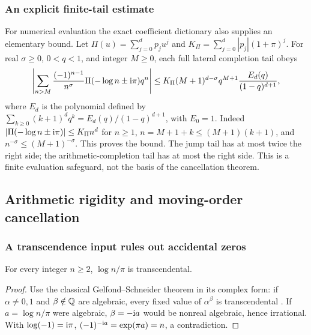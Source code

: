 \subsubsection{An explicit finite-tail estimate}
For numerical evaluation the exact coefficient dictionary also supplies
an elementary bound. Let $\Pi(u)=\sum_{j=0}^dp_ju^j$ and
$K_\Pi=\sum_{j=0}^d|p_j|(1+\pi)^j$. For real $\sigma\ge0$,
$0<q<1$, and integer $M\ge0$, each full lateral completion tail obeys
\begin{equation}\label{ojf:eq:tailbound}
 \left|\sum_{n>M}\frac{(-1)^{n-1}}{n^\sigma}
                  \Pi(-\log n\pm\mathrm{i}\pi)q^n\right|
 \le K_\Pi(M+1)^{d-\sigma}q^{M+1}
                  \frac{E_d(q)}{(1-q)^{d+1}},
\end{equation}
where $E_d$ is the polynomial defined by
$\sum_{k\ge0}(k+1)^dq^k=E_d(q)/(1-q)^{d+1}$, with $E_0=1$.
Indeed $|\Pi(-\log n\pm\mathrm{i}\pi)|\le K_\Pi n^d$ for $n\ge1$,
$n=M+1+k\le(M+1)(k+1)$, and $n^{-\sigma}\le(M+1)^{-\sigma}$.
This proves the bound. The jump tail has at most twice the right side;
the arithmetic-completion tail has at most the right side. This is a
finite evaluation safeguard, not the basis of the cancellation theorem.

\subsection{Arithmetic rigidity and moving-order cancellation}
\label{ojf:sec:neutral}

\subsubsection{A transcendence input rules out accidental zeros}

\begin{lemma}\label{ojf:lem:log-transcendence}
For every integer $n\ge2$, $\log n/\pi$ is transcendental.
\end{lemma}
\begin{proof}
Use the classical Gelfond--Schneider theorem in its complex form: if
$\alpha\ne0,1$ and $\beta\notin\mathbb{Q}$ are algebraic, every fixed value of
$\alpha^\beta$ is transcendental \cite[Theorem 3.1]{ojf:GS}.
If $a=\log n/\pi$ were algebraic, $\beta=-\mathrm{i} a$ would be nonreal
algebraic, hence irrational. With $\log(-1)=\mathrm{i}\pi$,
$(-1)^{-\mathrm{i} a}=\exp(\pi a)=n$, a contradiction.
\end{proof}

